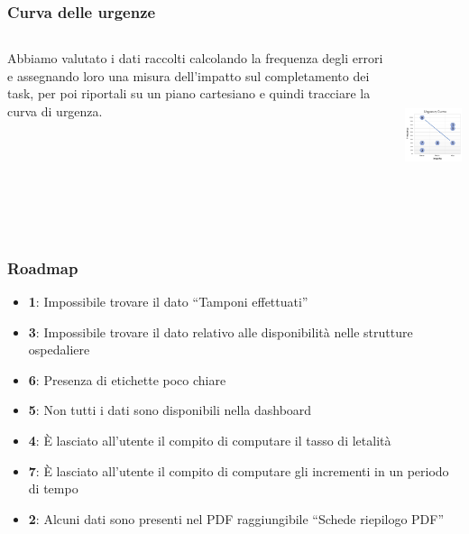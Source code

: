 \documentclass[handout]{beamer}
\begin{document}
			\begin{frame}
				\frametitle{Curva delle urgenze}
				\begin{columns}[t]
					\begin{column}[T]{5cm}
						Abbiamo valutato i dati raccolti calcolando la frequenza degli errori e assegnando loro una misura dell'impatto sul completamento dei task, per poi riportali su un piano cartesiano e quindi tracciare la curva di urgenza.
					\end{column}
					\begin{column}[T]{5cm}
						\includegraphics[height=5cm]{img/urgency_curve}
					\end{column}
				\end{columns}
			\end{frame}
		 
			\begin{frame}
				\frametitle{Roadmap}
				\begin{itemize}[<+->]
					\item \textbf{1}: Impossibile trovare il dato ``Tamponi effettuati''\\
					\item \textbf{3}: Impossibile trovare il dato relativo alle disponibilità nelle strutture ospedaliere\\
					\item \textbf{6}: Presenza di etichette poco chiare\\
					\item \textbf{5}: Non tutti i dati sono disponibili nella dashboard
					\item \textbf{4}: \`E lasciato all'utente il compito di computare il tasso di letalità\\
					\item \textbf{7}: \`E lasciato all'utente il compito di computare gli incrementi in un periodo di tempo\\
					\item \textbf{2}: Alcuni dati sono presenti nel PDF raggiungibile ``Schede riepilogo PDF''\\
				\end{itemize}
			\end{frame}
\end{document}
